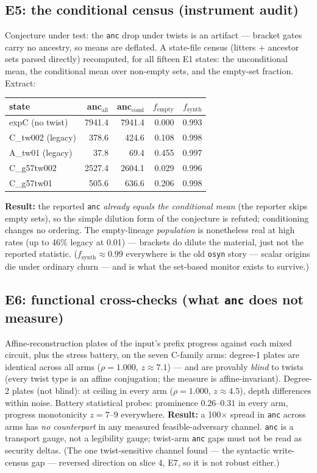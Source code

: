 \documentclass[11pt]{article}
\newcommand{\code}[1]{\texttt{#1}}
\begin{document}
\subsection{E5: the conditional census (instrument audit)}\label{sec:census}
Conjecture under test: the \code{anc} drop under twists is an artifact ---
bracket gates carry no ancestry, so means are deflated. A state-file census
(litters + ancestor sets parsed directly) recomputed, for all fifteen E1
states: the unconditional mean, the conditional mean over non-empty sets,
and the empty-set fraction. Extract:

\begin{center}\small
\begin{tabular}{lrrrr}
\toprule
state & anc$_{\mathrm{all}}$ & anc$_{\mathrm{cond}}$ & $f_{\mathrm{empty}}$ & $f_{\mathrm{synth}}$ \\
\midrule
expC (no twist) & 7941.4 & 7941.4 & 0.000 & 0.993 \\
C\_tw002 (legacy) & 378.6 & 424.6 & 0.108 & 0.998 \\
A\_tw01 (legacy) & 37.8 & 69.4 & 0.455 & 0.997 \\
C\_g57tw002 & 2527.4 & 2604.1 & 0.029 & 0.996 \\
C\_g57tw01 & 505.6 & 636.6 & 0.206 & 0.998 \\
\bottomrule
\end{tabular}
\end{center}

\textbf{Result:} the reported \code{anc} \emph{already equals the
conditional mean} (the reporter skips empty sets), so the simple dilution
form of the conjecture is refuted; conditioning changes no ordering. The
empty-lineage \emph{population} is nonetheless real at high rates (up to
46\% legacy at 0.01) --- brackets do dilute the material, just not the
reported statistic. ($f_{\mathrm{synth}}\approx0.99$ everywhere is the old
\code{osyn} story --- scalar origins die under ordinary churn --- and is
what the set-based monitor exists to survive.)

\subsection{E6: functional cross-checks (what \code{anc} does not measure)}
Affine-reconstruction plates of the input's prefix progress against each
mixed circuit, plus the stress battery, on the seven C-family arms:
degree-1 plates are identical across all arms ($\rho = 1.000$,
$z \approx 7.1$) --- and are provably \emph{blind} to twists (every twist
type is an affine conjugation; the measure is affine-invariant). Degree-2
plates (not blind): at ceiling in every arm ($\rho = 1.000$,
$z \approx 4.5$), depth differences within noise. Battery statistical
probes: prominence $0.26$--$0.31$ in every arm, progress monotonicity
$z = 7$--$9$ everywhere. \textbf{Result:} a 100$\times$ spread in
\code{anc} across arms has \emph{no counterpart} in any measured
feasible-adversary channel. \code{anc} is a transport gauge, not a
legibility gauge; twist-arm \code{anc} gaps must not be read as security
deltas. (The one twist-sensitive channel found --- the syntactic
write-census gap --- reversed direction on slice 4, E7, so it is not robust
either.)
\end{document}
